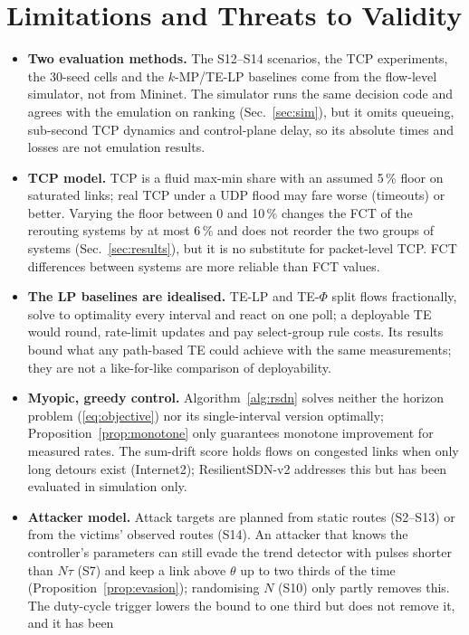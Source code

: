\section{Limitations and Threats to Validity}\label{sec:limits}
\begin{itemize}
\item \textbf{Two evaluation methods.} The S12--S14 scenarios, the TCP experiments, the 30-seed
  cells and the $k$-MP/TE-LP baselines come from the flow-level simulator, not from Mininet. The
  simulator runs the same decision code and agrees with the emulation on ranking
  (Sec.~\ref{sec:sim}), but it omits queueing, sub-second TCP dynamics and control-plane delay, so
  its absolute times and losses are not emulation results.
\item \textbf{TCP model.} TCP is a fluid max-min share with an assumed 5\,\% floor on saturated
  links; real TCP under a UDP flood may fare worse (timeouts) or better. Varying the floor between 0
  and 10\,\% changes the FCT of the rerouting systems by at most 6\,\% and does not reorder the two
  groups of systems (Sec.~\ref{sec:results}), but it is no substitute for packet-level TCP. FCT
  differences between systems are more reliable than FCT values.
\item \textbf{The LP baselines are idealised.} TE-LP and TE-$\Phi$ split flows fractionally, solve to optimality every
  interval and react on one poll; a deployable TE would round, rate-limit updates and pay
  select-group rule costs. Its results bound what any path-based TE could achieve with the same
  measurements; they are not a like-for-like comparison of deployability.
\item \textbf{Myopic, greedy control.} Algorithm~\ref{alg:rsdn} solves neither the horizon problem
  (\ref{eq:objective}) nor its single-interval version optimally; Proposition~\ref{prop:monotone}
  only guarantees monotone improvement for measured rates. The sum-drift score holds flows on
  congested links when only long detours exist (Internet2); ResilientSDN-v2 addresses this but has
  been evaluated in simulation only.
\item \textbf{Attacker model.} Attack targets are planned from static routes (S2--S13) or from the
  victims' observed routes (S14). An attacker that knows the controller's parameters can still
  evade the trend detector with pulses shorter than $N\tau$ (S7) and keep a link above $\theta$ up to
  two thirds of the time (Proposition~\ref{prop:evasion}); randomising $N$ (S10) only partly removes
  this. The duty-cycle trigger lowers the bound to one third but does not remove it, and it has been

\end{itemize}
